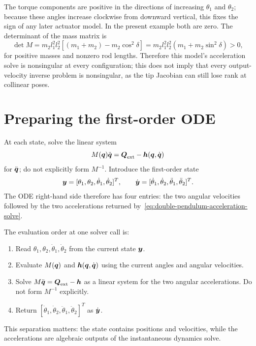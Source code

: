 \documentclass[../main.tex]{subfiles}
\begin{document}
The torque components are positive in the directions of increasing $\theta_1$ and $\theta_2$; because these angles increase clockwise from downward vertical, this fixes the sign of any later actuator model. In the present example both are zero. The determinant of the mass matrix is
\begin{equation}
\det M
=m_2l_1^2l_2^2\left[(m_1+m_2)-m_2\cos^2\delta\right]
=m_2l_1^2l_2^2\left(m_1+m_2\sin^2\delta\right)>0,
\label{eq:double-pendulum-mass-determinant}
\end{equation}
for positive masses and nonzero rod lengths. Therefore this model's acceleration solve is nonsingular at every configuration; this does not imply that every output-velocity inverse problem is nonsingular, as the tip Jacobian can still lose rank at collinear poses.

\section{Preparing the first-order ODE}

At each state, solve the linear system
\begin{equation}
	M(\boldsymbol{q})\ddot{\boldsymbol{q}}
		= \boldsymbol{Q}_{\mathrm{ext}}-\boldsymbol{h}(\boldsymbol{q},\dot{\boldsymbol{q}})
	\label{eq:double-pendulum-acceleration-solve}
\end{equation}
for $\ddot{\boldsymbol{q}}$; do not explicitly form $M^{-1}$. Introduce the first-order state
\begin{equation}
	\boldsymbol{y}=[\theta_1,\theta_2,\dot\theta_1,\dot\theta_2]^T,
	\qquad
	\dot{\boldsymbol{y}}=[\dot\theta_1,\dot\theta_2,\ddot\theta_1,\ddot\theta_2]^T.
	\label{eq:double-pendulum-first-order-state}
\end{equation}
The ODE right-hand side therefore has four entries: the two angular velocities followed by the two accelerations returned by~\eqref{eq:double-pendulum-acceleration-solve}.

The evaluation order at one solver call is:
\begin{enumerate}
\item Read $\theta_1,\theta_2,\dot\theta_1,\dot\theta_2$ from the current state $\boldsymbol{y}$.
\item Evaluate $M(\boldsymbol{q})$ and $\boldsymbol{h}(\boldsymbol{q},\dot{\boldsymbol{q}})$ using the current angles and angular velocities.
\item Solve $M\ddot{\boldsymbol{q}}=\boldsymbol{Q}_{\mathrm{ext}}-\boldsymbol{h}$ as a linear system for the two angular accelerations. Do not form $M^{-1}$ explicitly.
\item Return $[\dot\theta_1,\dot\theta_2,\ddot\theta_1,\ddot\theta_2]^T$ as $\dot{\boldsymbol{y}}$.
\end{enumerate}
This separation matters: the state contains positions and velocities, while the accelerations are algebraic outputs of the instantaneous dynamics solve.
\end{document}

